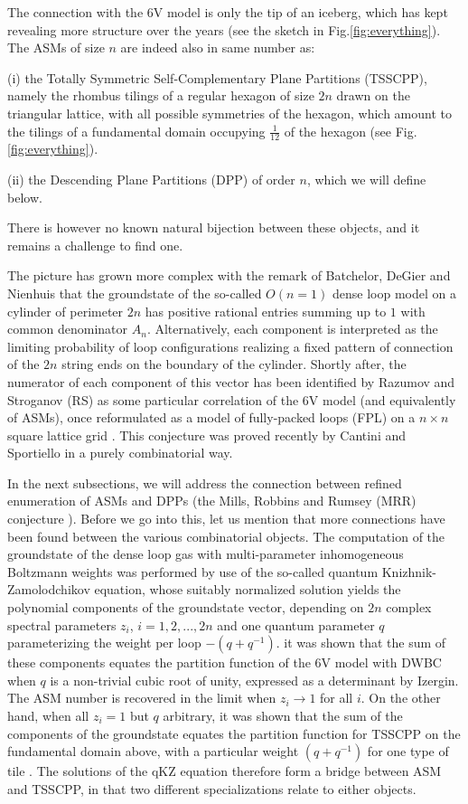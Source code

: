 \documentclass[12pt]{amsart}
\numberwithin{equation}{section}
\begin{document}
The connection with the 6V model is only the tip of an iceberg, which has kept revealing 
more structure over the years (see the sketch in Fig.\ref{fig:everything}).
The ASMs of size $n$ are indeed also in same number as: 

(i) the Totally Symmetric Self-Complementary Plane Partitions (TSSCPP), namely the rhombus tilings of a regular hexagon
of size $2n$ drawn on the triangular lattice, with all possible symmetries of the hexagon, which amount to the tilings of a 
fundamental domain occupying $\frac{1}{12}$ of the hexagon (see Fig.\ref{fig:everything}).

(ii) the Descending Plane Partitions (DPP) of order $n$, which we will define below.

There is however no known natural bijection between these objects, and it remains a challenge to find one.

The picture has grown more complex with the remark of Batchelor, DeGier and Nienhuis that the groundstate
of the so-called $O(n=1)$ dense loop model on a cylinder of perimeter $2n$ has positive rational entries summing up to $1$
with common denominator $A_n$. Alternatively, each component is interpreted as the limiting probability of loop configurations
realizing a fixed pattern of connection of the $2n$ string ends on the boundary of the cylinder.
Shortly after, the numerator of each component of this vector has been identified 
by Razumov and Stroganov (RS) as some particular correlation of the 6V model (and equivalently of ASMs), once reformulated
as a model of fully-packed loops (FPL) on a $n\times n$ square lattice grid \cite{RS}. 
This conjecture was proved recently by Cantini and Sportiello
\cite{CS} in a purely combinatorial way.

In the next subsections, we will address the connection between refined enumeration of ASMs and DPPs (the
Mills, Robbins and Rumsey (MRR) conjecture \cite{MRR}). Before we go into this, let us mention
that more connections have been found between the various combinatorial objects. The computation of the groundstate
of the dense loop gas with multi-parameter inhomogeneous Boltzmann weights was performed \cite{DZJ0} by use of the
so-called quantum Knizhnik-Zamolodchikov equation, whose suitably normalized solution yields the polynomial 
components of the groundstate vector, depending on $2n$ complex spectral parameters $z_i$, $i=1,2,...,2n$
and one quantum parameter $q$ parameterizing the weight per loop $-(q+q^{-1})$. it was shown \cite{DZJ0} that the sum
of these components equates the partition function of the 6V model with DWBC when $q$ is a non-trivial cubic root of unity,
expressed as a determinant by Izergin\cite{IZ}.
The ASM number is recovered in the limit when $z_i\to 1$ for all $i$.
On the other hand, when all $z_i=1$ but $q$ arbitrary, it was shown that the sum of the components of the groundstate
equates the partition function for TSSCPP on the fundamental domain above, with a particular weight $(q+q^{-1})$
for one type of tile \cite{DZJ1}. The solutions of the qKZ equation therefore form a bridge between ASM and TSSCPP, in that
two different specializations relate to either objects.
\end{document}
